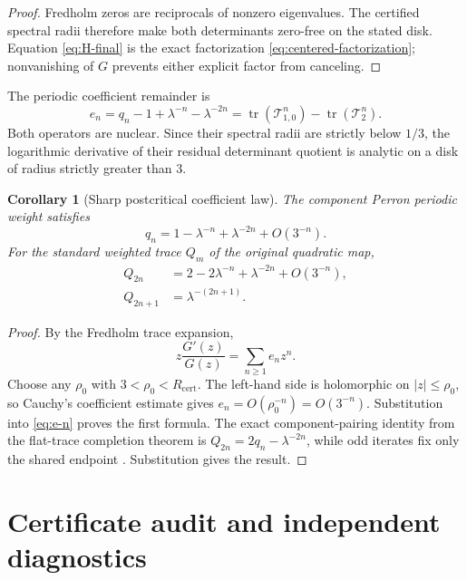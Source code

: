 \documentclass[11pt]{article}
\newtheorem{corollary}[theorem]{Corollary}
\theoremstyle{definition}
\theoremstyle{remark}
\newcommand{\cT}{\mathcal T}
\begin{document}
\begin{proof}
Fredholm zeros are reciprocals of nonzero eigenvalues.  The certified spectral
radii therefore make both determinants zero-free on the stated disk.
Equation \eqref{eq:H-final} is the exact factorization
\eqref{eq:centered-factorization}; nonvanishing of $G$ prevents either
explicit factor from canceling.
\end{proof}

The periodic coefficient remainder is
\begin{equation}\label{eq:e-n}
 e_n=q_n-1+\lambda^{-n}-\lambda^{-2n}
 =\operatorname{tr}(\cT_{1,0}^n)-\operatorname{tr}(\cT_2^n).
\end{equation}
Both operators are nuclear.  Since their spectral radii are strictly below
$1/3$, the logarithmic derivative of their residual determinant quotient is
analytic on a disk of radius strictly greater than $3$.

\begin{corollary}[Sharp postcritical coefficient law]
\label{cor:sharp-law}
The component Perron periodic weight satisfies
\begin{equation}\label{eq:sharp-law}
 \boxed{
 q_n=1-\lambda^{-n}+\lambda^{-2n}+O(3^{-n}).}
\end{equation}
For the standard weighted trace $Q_m$ of the original quadratic map,
\begin{align}
 Q_{2n}
 &=2-2\lambda^{-n}+\lambda^{-2n}+O(3^{-n}),
 \label{eq:Q-even-sharp}\\
 Q_{2n+1}
 &=\lambda^{-(2n+1)}.
 \label{eq:Q-odd-exact}
\end{align}
\end{corollary}

\begin{proof}
By the Fredholm trace expansion,
\[
 z\frac{G'(z)}{G(z)}=\sum_{n\ge1}e_nz^n.
\]
Choose any $\rho_0$ with $3<\rho_0<R_{\mathrm{cert}}$.  The left-hand side is
holomorphic on $|z|\le\rho_0$, so Cauchy's coefficient estimate gives
$e_n=O(\rho_0^{-n})=O(3^{-n})$.  Substitution into \eqref{eq:e-n} proves the
first formula.  The exact component-pairing identity from the flat-trace
completion theorem is
$Q_{2n}=2q_n-\lambda^{-2n}$, while odd iterates fix only the shared endpoint
\citep{WangFlatTrace2026}.  Substitution gives the result.
\end{proof}

\section{Certificate audit and independent diagnostics}
\label{sec:audit}
\end{document}
